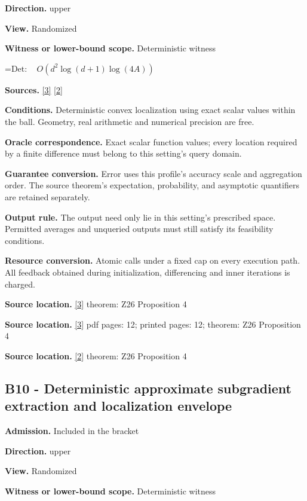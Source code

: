 \documentclass[10pt,a4paper]{article}
\newcommand{\AtlasMath}[1]{\par\begingroup\centering\setbox0=\hbox{$\displaystyle #1$}\ifdim\wd0>1.4\linewidth\typeout{ATLAS WIDE FORMULA: \the\wd0}\fi\ifdim\wd0>\linewidth\resizebox{\linewidth}{!}{\box0}\else\box0\fi\par\endgroup}
\begin{document}
\textbf{Direction.} upper

\textbf{View.} Randomized

\textbf{Witness or lower-bound scope.} Deterministic witness

\AtlasMath{\mathrm{Det}:\quad O(d^2\log(d+1)\log(4A))}
\textbf{Sources.} \href{https://arxiv.org/html/2607.16558v2}{[3]} \href{https://www.mathnet.ru/php/archive.phtml?jrnid=mzm&option_lang=eng&paperid=1697&wshow=paper}{[2]}

\textbf{Conditions.} Deterministic convex localization using exact scalar values within the ball. Geometry, real arithmetic and numerical precision are free.

\textbf{Oracle correspondence.} Exact scalar function values; every location required by a finite difference must belong to this setting's query domain.

\textbf{Guarantee conversion.} Error uses this profile's accuracy scale and aggregation order. The source theorem's expectation, probability, and asymptotic quantifiers are retained separately.

\textbf{Output rule.} The output need only lie in this setting's prescribed space. Permitted averages and unqueried outputs must still satisfy its feasibility conditions.

\textbf{Resource conversion.} Atomic calls under a fixed cap on every execution path. All feedback obtained during initialization, differencing and inner iterations is charged.

\textbf{Source location.} \href{https://arxiv.org/html/2607.16558v2}{[3]} theorem: Z26 Proposition 4

\textbf{Source location.} \href{https://arxiv.org/html/2607.16558v2}{[3]} pdf pages: 12; printed pages: 12; theorem: Z26 Proposition 4

\textbf{Source location.} \href{https://www.mathnet.ru/php/archive.phtml?jrnid=mzm&option_lang=eng&paperid=1697&wshow=paper}{[2]} theorem: Z26 Proposition 4

\subsection{B10 - Deterministic approximate subgradient extraction and localization envelope}
\textbf{Admission.} Included in the bracket

\textbf{Direction.} upper

\textbf{View.} Randomized

\textbf{Witness or lower-bound scope.} Deterministic witness
\end{document}
